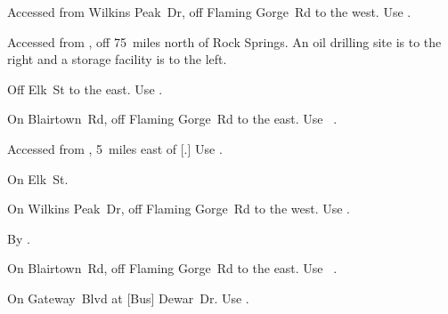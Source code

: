 
\begin{LocationList}

Accessed from Wilkins Peak~Dr, off  Flaming Gorge~Rd to the west.
Use  .

Accessed from , off  75~miles north of Rock Springs.
An oil drilling site is to the right and a storage facility is to the left.

Off  Elk~St to the east.
Use  .

On Blairtown~Rd, off  Flaming Gorge~Rd to the east.
Use~ .

Accessed from , 5~miles east of [.]
Use  .

\Location{\RecruitmentAgency \Recruitment}
On Elk~St.

On Wilkins Peak~Dr, off  Flaming Gorge~Rd to the west.
Use  .

\Location{\TruckStop \Gas \Rest}
By  .

On Blairtown~Rd, off  Flaming Gorge~Rd to the east.
Use~ .

On Gateway~Blvd at [Bus] Dewar~Dr.
Use  .

\end{LocationList}
